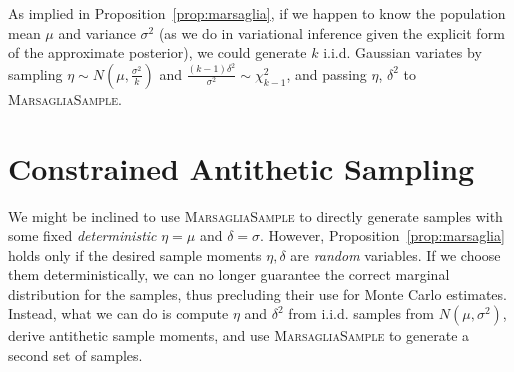 As implied in Proposition~\ref{prop:marsaglia}, if we happen to know the population mean $\mu$ and variance $\sigma^2$ (as we do in variational inference given the explicit form of the approximate posterior), we could generate $k$ i.i.d. Gaussian variates by sampling $\eta \sim N(\mu, \frac{\sigma^2}{k})$ and $\frac{(k-1)\delta^2}{\sigma^2} \sim \chi^2_{k-1}$, and passing $\eta$, $\delta^2$ to \textsc{MarsagliaSample}.

\section{Constrained Antithetic Sampling}

We might be inclined to use \textsc{MarsagliaSample} to directly generate samples with some fixed \emph{deterministic} $\eta=\mu$ and $\delta=\sigma$. However, Proposition~\ref{prop:marsaglia} holds only if the desired sample moments $\eta,\delta$ are \emph{random} variables. If we choose them deterministically, we can no longer guarantee the correct marginal distribution for the samples, thus precluding their use for Monte Carlo estimates. Instead, what we can do is compute $\eta$ and $\delta^2$ from i.i.d. samples from $N(\mu, \sigma^2)$, derive antithetic sample moments, and use \textsc{MarsagliaSample} to generate a second set of samples.

